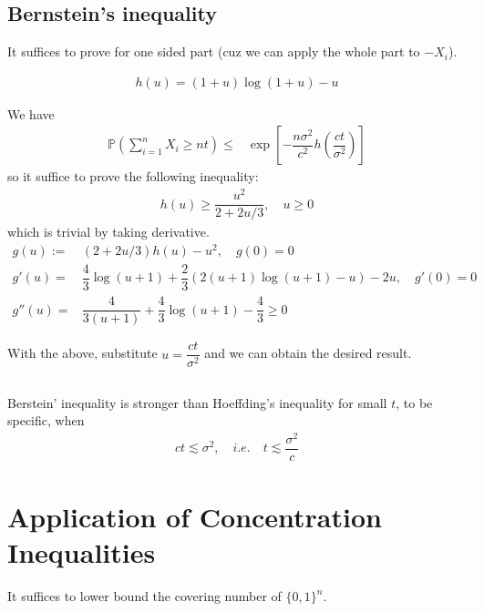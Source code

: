 \documentclass[11pt,a4paper]{ctexart}
\numberwithin{equation}{section}%
\begin{document}
\subsection{Bernstein's inequality}

It suffices to prove for one sided part (cuz we can apply the whole part to $ -X_i $). 


\begin{align*}
    h(u) = (1+u)\log(1+u) - u
\end{align*}



We have
\begin{align*}
    \mathbb{P}\left( \sum_{i=1}^n X_i \geq nt \right) \leq & \exp\left[ -\dfrac{ n\sigma ^2 }{ c^2 } h(\dfrac{ ct }{ \sigma ^2 } ) \right]  
\end{align*}
so it suffice to prove the following inequality:
\begin{align*}
    h(u)\geq \dfrac{ u^2 }{ 2+2u/3 }  ,\quad u\geq 0
\end{align*}
which is trivial by taking derivative.
\begin{align*}
    g(u):=& (2 + 2u/3)h(u) - u^2 ,\quad g(0)=0\\
    g'(u) =& \dfrac{ 4 }{ 3 }\log (u+1) + \dfrac{ 2 }{ 3 }( 2(u+1)\log(u+1) - u ) - 2u ,\quad g'(0)=0\\
    g''(u)=& \dfrac{ 4 }{ 3(u+1) } + \dfrac{ 4 }{ 3 }\log(u+1) - \dfrac{ 4 }{ 3 } \geq 0
\end{align*}

With the above, substitute $ u = \dfrac{ ct }{ \sigma ^2 }  $ and we can obtain the desired result.




\subsection{}

Berstein' inequality is stronger than Hoeffding's inequality for small $ t $, to be specific, when
\begin{align*}
     ct\lesssim \sigma ^2,\quad i.e. \quad t\lesssim \dfrac{ \sigma ^2 }{ c }
\end{align*}


\section{Application of Concentration Inequalities}

It suffices to lower bound the covering number of $ \{0,1\}^{n} $. 
\end{document}

